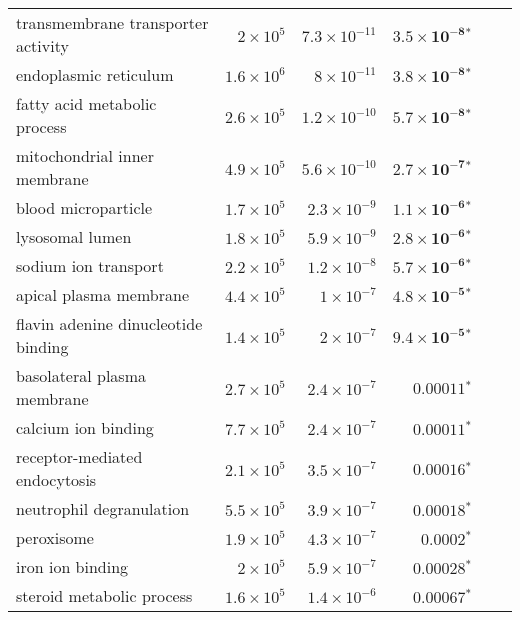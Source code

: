 \begin{longtable}{|l|r|r|r|r|r|}
        transmembrane transporter activity &  $ 2\times 10^{5}$ & $7.3\times 10^{-11}$ &   $\bm{3.5\times 10^{-8}{^*}}$ \\
                     endoplasmic reticulum & $1.6\times 10^{6}$ &  $ 8\times 10^{-11}$ &   $\bm{3.8\times 10^{-8}{^*}}$ \\
              fatty acid metabolic process & $2.6\times 10^{5}$ & $1.2\times 10^{-10}$ &   $\bm{5.7\times 10^{-8}{^*}}$ \\
              mitochondrial inner membrane & $4.9\times 10^{5}$ & $5.6\times 10^{-10}$ &   $\bm{2.7\times 10^{-7}{^*}}$ \\
                       blood microparticle & $1.7\times 10^{5}$ &  $2.3\times 10^{-9}$ &   $\bm{1.1\times 10^{-6}{^*}}$ \\
                           lysosomal lumen & $1.8\times 10^{5}$ &  $5.9\times 10^{-9}$ &   $\bm{2.8\times 10^{-6}{^*}}$ \\
                      sodium ion transport & $2.2\times 10^{5}$ &  $1.2\times 10^{-8}$ &   $\bm{5.7\times 10^{-6}{^*}}$ \\
                    apical plasma membrane & $4.4\times 10^{5}$ &   $ 1\times 10^{-7}$ &   $\bm{4.8\times 10^{-5}{^*}}$ \\
       flavin adenine dinucleotide binding & $1.4\times 10^{5}$ &   $ 2\times 10^{-7}$ &   $\bm{9.4\times 10^{-5}{^*}}$ \\
               basolateral plasma membrane & $2.7\times 10^{5}$ &  $2.4\times 10^{-7}$ &             $\bm{0.00011{^*}}$ \\
                       calcium ion binding & $7.7\times 10^{5}$ &  $2.4\times 10^{-7}$ &             $\bm{0.00011{^*}}$ \\
             receptor-mediated endocytosis & $2.1\times 10^{5}$ &  $3.5\times 10^{-7}$ &             $\bm{0.00016{^*}}$ \\
                  neutrophil degranulation & $5.5\times 10^{5}$ &  $3.9\times 10^{-7}$ &             $\bm{0.00018{^*}}$ \\
                                peroxisome & $1.9\times 10^{5}$ &  $4.3\times 10^{-7}$ &              $\bm{0.0002{^*}}$ \\
                          iron ion binding &  $ 2\times 10^{5}$ &  $5.9\times 10^{-7}$ &             $\bm{0.00028{^*}}$ \\
                 steroid metabolic process & $1.6\times 10^{5}$ &  $1.4\times 10^{-6}$ &             $\bm{0.00067{^*}}$ \\

\end{longtable}
